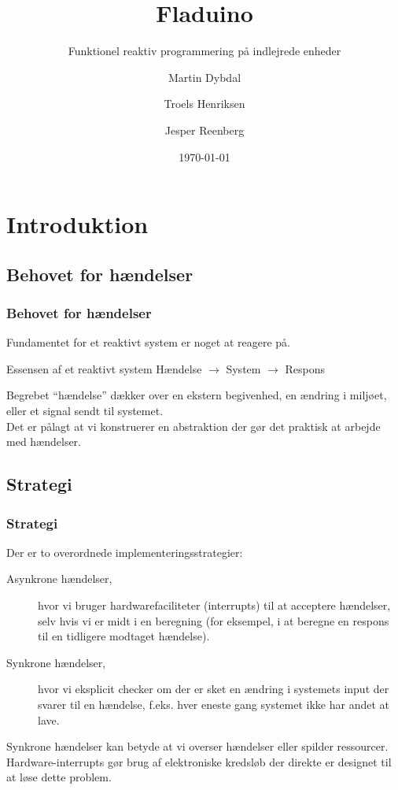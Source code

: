 \documentclass{beamer}
\title{Fladuino}
\subtitle{Funktionel reaktiv programmering på indlejrede enheder}
\author{Martin Dybdal \and Troels Henriksen \and Jesper Reenberg}
\institute{\textrm{Datalogisk Institut, Københavns Universitet}}
\date{\today}
\begin{document}
\frame{\titlepage}


\section{Introduktion}

\subsection{Behovet for hændelser}

\begin{frame}
\frametitle{Behovet for hændelser}

Fundamentet for et reaktivt system er noget at reagere på.

\begin{block}{Essensen af et reaktivt system}
Hændelse $\rightarrow$ System $\rightarrow$ Respons
\end{block}

Begrebet ``hændelse'' dækker over en ekstern begivenhed, en ændring i
miljøet, eller et signal sendt til systemet.
\\
Det er pålagt at vi konstruerer en abstraktion der gør det praktisk at
arbejde med hændelser.

\end{frame}

\subsection{Strategi}
\begin{frame}
\frametitle{Strategi}

Der er to overordnede implementeringsstrategier:

\begin{description}
\item[Asynkrone hændelser,] hvor vi bruger hardwarefaciliteter
  (interrupts) til at acceptere hændelser, selv hvis vi er midt i en
  beregning (for eksempel, i at beregne en respons til en tidligere
  modtaget hændelse).
\item[Synkrone hændelser,] hvor vi eksplicit checker om der er sket en
  ændring i systemets input der svarer til en hændelse, f.eks. hver
  eneste gang systemet ikke har andet at lave.
\end{description}

Synkrone hændelser kan betyde at vi overser hændelser eller spilder
ressourcer.  Hardware-interrupts gør brug af elektroniske kredsløb der
direkte er designet til at løse dette problem.

\end{frame}
\end{document}
